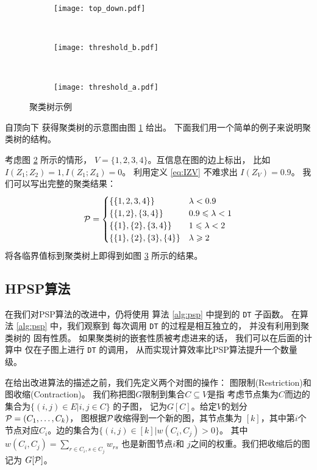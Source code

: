   \begin{figure}[!ht]
    \centering
    \begin{subfigure}[b]{0.38\linewidth}
      \centering
      \texttt{[image: top\_down.pdf]}
      \caption{}\label{fig:top_down}
    \end{subfigure}~
  \begin{subfigure}[b]{0.29\linewidth}
    \centering
    \texttt{[image: threshold\_b.pdf]}
    \caption{}\label{fig:threshold_b}
  \end{subfigure}~
  \begin{subfigure}[b]{0.33\linewidth}
    \centering
    \texttt{[image: threshold\_a.pdf]}
    \caption{}\label{fig:threshold_a}
  \end{subfigure}
  \caption{聚类树示例}\label{fig:mmi_example}
  \end{figure}
自顶向下
获得聚类树的示意图由图 \ref{fig:top_down} 给出。
下面我们用一个简单的例子来说明聚类树的结构。
  \begin{example}\label{ex:mmi_tree}
考虑图 \ref{fig:threshold_b} 所示的情形，
$V=\{1,2,3,4\}$。互信息在图的边上标出，
比如 $I(Z_1;Z_2)=1, I(Z_1;Z_4)=0$。
利用定义 \ref{eq:IZV} 不难求出
$I(Z_V)=0.9$。 
我们可以写出完整的聚类结果：
\begin{equation*}
\P = 
\begin{cases}
\{\{1,2,3,4\}\} & \lambda < 0.9 \\
\{\{1,2\},\{3,4\}\} & 0.9 \leq \lambda < 1 \\
\{\{1\},\{2\},\{3,4\}\} & 1 \leq \lambda < 2\\
\{\{1\},\{2\},\{3\},\{4\}\} & \lambda \geq 2
\end{cases}
\end{equation*}
将各临界值标到聚类树上即得到如图
 \ref{fig:threshold_a} 所示的结果。
\end{example}
\subsection{HPSP算法}
在我们对PSP算法的改进中，仍将使用
算法 \ref{alg:psp} 中提到的
\texttt{DT} 子函数。
在算法 \ref{alg:psp} 中，我们观察到
每次调用 \texttt{DT} 的过程是相互独立的，
并没有利用到聚类树的 固有性质。
如果聚类树的嵌套性质被考虑进来的话，
我们可以在后面的计算中
仅在子图上进行 \texttt{DT} 的调用，
从而实现计算效率比PSP算法提升一个数量级。

在给出改进算法的描述之前，我们先定义两个对图的操作：
图限制(Restriction)和图收缩(Contraction)。
我们称把图$G$限制到集合$C\subseteq V$是指
考虑节点集为$C$而边的集合为$\{(i,j) \in E | i,j \in C \}$
的子图，
记为$G[C]$。给定$V$的划分 $\P=(C_1, \dots, C_k)$，
图根据$\P$收缩得到一个新的图，其节点集为
$[k]$，其中第$i$个节点对应$C_i$。边的集合为$\{(i,j) \in [k] | w(C_i, C_j) > 0 \}$。
其中$w(C_i, C_j)=\sum_{r \in C_i, s \in C_j} w_{rs} $
也是新图节点$i$和 $j$之间的权重。我们把收缩后的图记为
$G[\P]$。


